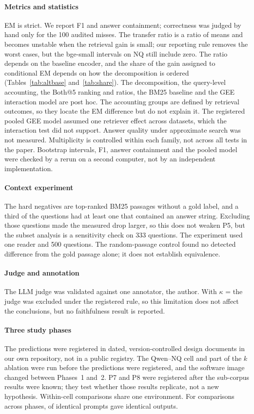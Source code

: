 \paragraph{Metrics and statistics}
EM is strict. We report F1 and answer containment; correctness was judged by hand only for the 100 audited misses. The transfer ratio is a ratio of means and becomes unstable when the retrieval gain is small; our reporting rule removes the worst cases, but the bge-small intervals on NQ still include zero. The ratio depends on the baseline encoder, and the share of the gain assigned to conditional EM depends on how the decomposition is ordered (Tables~\ref{tab:altbase} and~\ref{tab:share}). The decomposition, the query-level accounting, the Both@5 ranking and ratios, the BM25 baseline and the GEE interaction model are post hoc. The accounting groups are defined by retrieval outcomes, so they locate the EM difference but do not explain it. The registered pooled GEE model assumed one retriever effect across datasets, which the interaction test did not support. Answer quality under approximate search was not measured. Multiplicity is controlled within each family, not across all tests in the paper. Bootstrap intervals, F1, answer containment and the pooled model were checked by a rerun on a second computer, not by an independent implementation.

\paragraph{Context experiment}
The hard negatives are top-ranked BM25 passages without a gold label, and a third of the questions had at least one that contained an answer string. Excluding those questions made the measured drop larger, so this does not weaken P5, but the subset analysis is a sensitivity check on 333 questions. The experiment used one reader and 500 questions. The random-passage control found no detected difference from the gold passage alone; it does not establish equivalence.

\paragraph{Judge and annotation}
The LLM judge was validated against one annotator, the author. With $\kappa$ =  the judge was excluded under the registered rule, so this limitation does not affect the conclusions, but no faithfulness result is reported.

\paragraph{Three study phases}
The predictions were registered in dated, version-controlled design documents in our own repository, not in a public registry. The Qwen--NQ cell and part of the $k$ ablation were run before the predictions were registered, and the software image changed between Phases~1 and~2. P7 and P8 were registered after the sub-corpus results were known; they test whether those results replicate, not a new hypothesis. Within-cell comparisons share one environment. For comparisons across phases,  of  identical prompts gave identical outputs.
